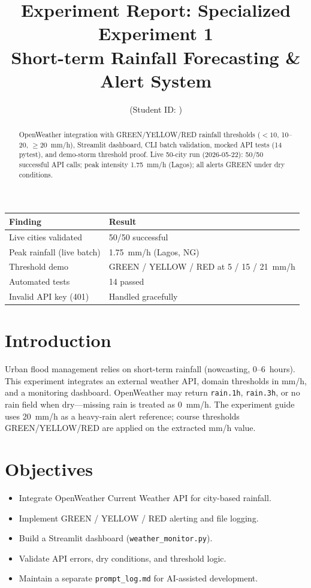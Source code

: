 \documentclass[11pt,a4paper]{article}
\title{Experiment Report: Specialized Experiment 1\\Short-term Rainfall Forecasting \& Alert System}
\author{\studentname \quad (Student ID: \studentid)}
\date{\reportdate}
\begin{document}
\maketitle

\begin{abstract}
OpenWeather integration with GREEN/YELLOW/RED rainfall thresholds ($<10$, 10--20, $\ge 20$~mm/h), Streamlit dashboard, CLI batch validation, mocked API tests (14 pytest), and demo-storm threshold proof. Live 50-city run (2026-05-22): 50/50 successful API calls; peak intensity 1.75~mm/h (Lagos); all alerts GREEN under dry conditions.
\end{abstract}

\begin{tcolorbox}[
  colback=blue!4,
  colframe=blue!55!black,
  title=\textbf{Key Findings (Executive Summary)},
  fonttitle=\bfseries,
  arc=2mm,
]
\begin{tabular}{@{}ll@{}}
\textbf{Finding} & \textbf{Result} \\
\hline
Live cities validated & 50/50 successful \\
Peak rainfall (live batch) & 1.75~mm/h (Lagos, NG) \\
Threshold demo & GREEN / YELLOW / RED at 5 / 15 / 21~mm/h \\
Automated tests & 14 passed \\
Invalid API key (401) & Handled gracefully \\
\end{tabular}
\end{tcolorbox}

\section{Introduction}
Urban flood management relies on short-term rainfall (nowcasting, 0--6~hours). This experiment integrates an external weather API, domain thresholds in mm/h, and a monitoring dashboard. OpenWeather may return \texttt{rain.1h}, \texttt{rain.3h}, or no rain field when dry---missing rain is treated as 0~mm/h. The experiment guide uses 20~mm/h as a heavy-rain alert reference; course thresholds GREEN/YELLOW/RED are applied on the extracted mm/h value.

\section{Objectives}
\begin{itemize}[noitemsep]
  \item Integrate OpenWeather Current Weather API for city-based rainfall.
  \item Implement GREEN / YELLOW / RED alerting and file logging.
  \item Build a Streamlit dashboard (\texttt{weather\_monitor.py}).
  \item Validate API errors, dry conditions, and threshold logic.
  \item Maintain a separate \texttt{prompt\_log.md} for AI-assisted development.
\end{itemize}
\end{document}
